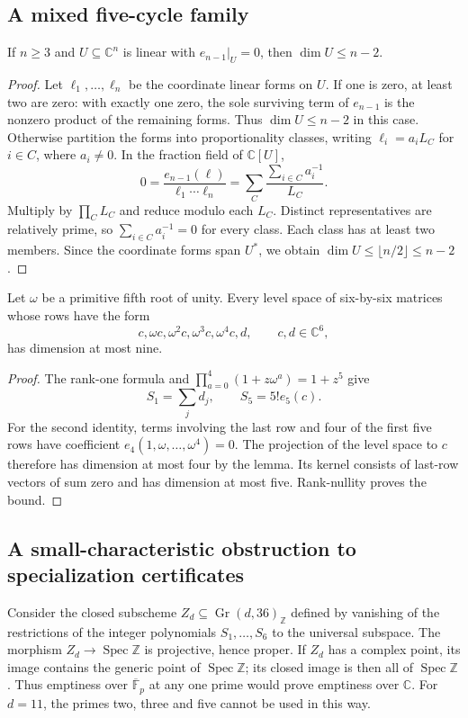 \subsection{A mixed five-cycle family}

\begin{lemma}
If $n\geq3$ and $U\subseteq\mathbb C^n$ is linear with $e_{n-1}|_U=0$, then $\dim U\leq n-2$.
\end{lemma}
\begin{proof}
Let $\ell_1,\ldots,\ell_n$ be the coordinate linear forms on $U$.
If one is zero, at least two are zero: with exactly one zero, the sole surviving term of $e_{n-1}$ is the nonzero product of the remaining forms. Thus $\dim U\leq n-2$ in this case.
Otherwise partition the forms into proportionality classes, writing $\ell_i=a_iL_C$ for $i\in C$, where $a_i\ne0$. In the fraction field of $\mathbb C[U]$,
\[
 0=\frac{e_{n-1}(\ell)}{\ell_1\cdots\ell_n}
   =\sum_C\frac{\sum_{i\in C}a_i^{-1}}{L_C}.
\]
Multiply by $\prod_C L_C$ and reduce modulo each $L_C$.
Distinct representatives are relatively prime, so $\sum_{i\in C}a_i^{-1}=0$ for every class.
Each class has at least two members. Since the coordinate forms span $U^*$, we obtain $\dim U\leq\lfloor n/2\rfloor\leq n-2$.
\end{proof}

\begin{proposition}
Let $\omega$ be a primitive fifth root of unity. Every level space of six-by-six matrices whose rows have the form
\[
 c,\omega c,\omega^2c,\omega^3c,\omega^4c,d,
 \qquad c,d\in\mathbb C^6,
\]
has dimension at most nine.
\end{proposition}
\begin{proof}
The rank-one formula and $\prod_{a=0}^4(1+z\omega^a)=1+z^5$ give
\[
 S_1=\sum_jd_j,\qquad S_5=5!e_5(c).
\]
For the second identity, terms involving the last row and four of the first five rows have coefficient $e_4(1,\omega,\ldots,\omega^4)=0$.
The projection of the level space to $c$ therefore has dimension at most four by the lemma.
Its kernel consists of last-row vectors of sum zero and has dimension at most five. Rank-nullity proves the bound.
\end{proof}

\subsection{A small-characteristic obstruction to specialization certificates}

Consider the closed subscheme $Z_d\subseteq\operatorname{Gr}(d,36)_{\mathbb Z}$ defined by vanishing of the restrictions of the integer polynomials $S_1,\ldots,S_6$ to the universal subspace.
The morphism $Z_d\to\operatorname{Spec}\mathbb Z$ is projective, hence proper.
If $Z_d$ has a complex point, its image contains the generic point of $\operatorname{Spec}\mathbb Z$; its closed image is then all of $\operatorname{Spec}\mathbb Z$.
Thus emptiness over $\overline{\mathbb F}_p$ at any one prime would prove emptiness over $\mathbb C$.
For $d=11$, the primes two, three and five cannot be used in this way.

